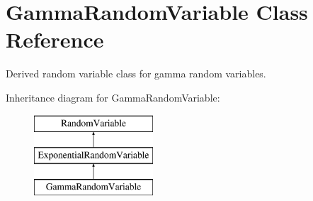 \section{Gamma\+Random\+Variable Class Reference}
\label{classPecos_1_1GammaRandomVariable}


Derived random variable class for gamma random variables.  


Inheritance diagram for Gamma\+Random\+Variable\+:\begin{figure}[H]
\begin{center}
\leavevmode
\includegraphics[height=3.000000cm]{classPecos_1_1GammaRandomVariable}
\end{center}
\end{figure}
